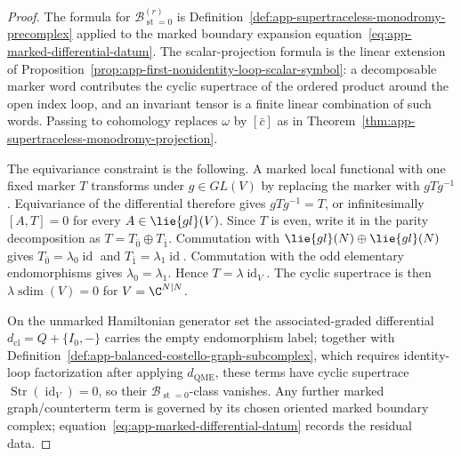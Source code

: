 \begin{proof}
  The formula for
  \(\mathcal B^{(r)}_{\operatorname{st}=0}\) is
  Definition~\ref{def:app-supertraceless-monodromy-precomplex} applied to
  the marked boundary expansion
  equation~\eqref{eq:app-marked-differential-datum}.  The scalar-projection
  formula is the linear extension of
  Proposition~\ref{prop:app-first-nonidentity-loop-scalar-symbol}: a
  decomposable marker word contributes the cyclic supertrace of the
  ordered product around the open index loop, and an invariant tensor is a
  finite linear combination of such words.  Passing to cohomology replaces
  \(\omega\) by \([\bar c]\) as in
  Theorem~\ref{thm:app-supertraceless-monodromy-projection}.

  The equivariance constraint is the following.  A marked local
  functional with one fixed marker \(T\) transforms under \(g\in GL(V)\)
  by replacing the marker with \(gTg^{-1}\).  Equivariance of the
  differential therefore gives \(gTg^{-1}=T\), or infinitesimally
  \([A,T]=0\) for every \(A\in\lie{gl}(V)\).  Since \(T\) is even, write it
  in the parity decomposition as
  \(T=T_{\bar0}\oplus T_{\bar1}\).  Commutation with
  \(\lie{gl}(N)\oplus\lie{gl}(N)\) gives
  \(T_{\bar0}=\lambda_0\operatorname{id}\) and
  \(T_{\bar1}=\lambda_1\operatorname{id}\).  Commutation with the odd
  elementary endomorphisms gives \(\lambda_0=\lambda_1\).  Hence
  \(T=\lambda\operatorname{id}_V\).  The cyclic supertrace is then
  \(\lambda\operatorname{sdim}(V)=0\) for \(V=\C^{N|N}\).

  On the unmarked Hamiltonian generator set the associated-graded
  differential \(d_{\mathrm{cl}}=Q+\{I_0,-\}\) carries the empty endomorphism
  label; together with
  Definition~\ref{def:app-balanced-costello-graph-subcomplex}, which
  requires identity-loop factorization after applying
  \(d_{\mathrm{QME}}\), these terms have cyclic supertrace
  \(\operatorname{Str}(\operatorname{id}_V)=0\), so their
  \(\mathcal B_{\operatorname{st}=0}\)-class vanishes.  Any further
  marked graph/counterterm term is governed by its chosen oriented marked
  boundary complex; equation~\eqref{eq:app-marked-differential-datum}
  records the residual data.
\end{proof}

